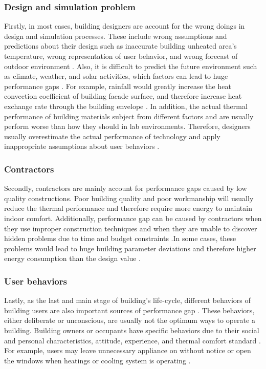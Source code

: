 \documentclass[11pt, a4paper]{article}
\theoremstyle{definition}
\begin{document}
		\subsubsection{Design and simulation problem}
		Firstly, in most cases, building designers are account for the wrong doings in design and simulation processes. These include wrong assumptions and predictions about their design such as inaccurate building unheated area's temperature, wrong representation of user behavior, and wrong forecast of outdoor environment \cite{HOFFMANN201731,NIU2016275}. Also, it is difficult to predict the future environment such as climate, weather, and solar activities, which factors can lead to huge performance gaps \cite{DIAZ2017393,doi:10.1080/19401493.2012.718797}. For example, rainfall would greatly increase the heat convection coefficient of building facade surface, and therefore increase heat exchange rate through the building envelope \cite{DIAZ2017393}. In addition, the actual thermal performance of building materials subject from different factors and are usually perform worse than how they should in lab environments. Therefore, designers usually overestimate the actual performance of technology and apply inappropriate assumptions about user behaviors \cite{DEWILDE201440}. \\

		\subsubsection{Contractors}
		Secondly, contractors are mainly account for performance gaps caused by low quality constructions. Poor building quality and poor workmanship will usually reduce the thermal performance and therefore require more energy to maintain indoor comfort. Additionally, performance gap can be caused by contractors when they use improper construction techniques and when they are unable to discover hidden problems due to time and budget constraints \cite{DEWILDE201440}.In some cases, these problems would lead to huge building parameter deviations and therefore higher energy consumption than the design value \cite{FREI2017421,DEWILDE201440}. \\

		\subsubsection{User behaviors}
		Lastly, as the last and main stage of building's life-cycle, different behaviors of building users are also important sources of performance gap \cite{ZOU2018165}. These behaviors, either deliberate or unconscious, are usually not the optimum ways to operate a building. Building owners or occupants have specific behaviors due to their social and personal characteristics, attitude, experience, and thermal comfort standard \cite{userevaluations,LAWRENCE2016651}. For example, users may leave unnecessary appliance on without notice or open the windows when heatings or cooling system is operating \cite{FREI2017421}.\\
\end{document}
